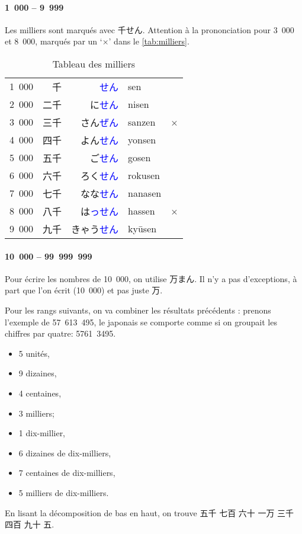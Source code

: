 \documentclass[a4paper,10pt,french,openany]{memoir}
\newcommand{\term}[1]{\textcolor{blue}{#1}}
\begin{document}
\paragraph{1~000 -- 9~999}
Les milliers sont marqués avec \ruby 千{せん}. Attention à la prononciation pour 3~000 et 8~000, marqués par un `×' dans le \autoref{tab:milliers}.

\begin{table}[p]
 \centering
 \caption{Tableau des milliers}
 \label{tab:milliers}
 \begin{tabular}{crrll}
  1~000 & 千 & \term{せん} &sen\\
  2~000 & 二千 & に\term{せん}      &nisen\\
  3~000 & 三千 & さん\term{ぜん}    &sanzen&×\\
  4~000 & 四千 & よん\term{せん}    &yonsen\\
  5~000 & 五千 & ご\term{せん}      &gosen\\
  6~000 & 六千 & ろく\term{せん}    &rokusen\\
  7~000 & 七千 & なな\term{せん}    &nanasen\\
  8~000 & 八千 & は\term{っせん}    &hassen&×\\
  9~000 & 九千 & きゃう\term{せん} &kyūsen\\
 \end{tabular}
\end{table}

\paragraph{10~000 -- 99~999~999}
Pour écrire les nombres de 10~000, on utilise \ruby 万{まん}. Il n'y a pas d'exceptions, à part que l'on écrit  (10~000) et pas juste 万.

Pour les rangs suivants, on va combiner les résultats précédents : prenons l'exemple de 57~613~495, le japonais se comporte comme si on groupait les chiffres par quatre: 5761~3495.
\begin{itemize}
 \item 5 unités,
 \item 9 dizaines,
 \item 4 centaines,
 \item 3 milliers;
 \item 1 dix-millier,
 \item 6 dizaines de dix-milliers,
 \item 7 centaines de dix-milliers,
 \item 5 milliers de dix-milliers.
\end{itemize}
En lisant la décomposition de bas en haut, on trouve 五千 七百 六十 一万 三千 四百 九十 五.
\end{document}
